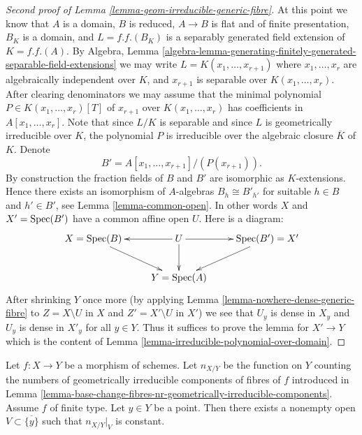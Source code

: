 \begin{proof}[Second proof of Lemma \ref{lemma-geom-irreducible-generic-fibre}]
\medskip\noindent
At this point we know that $A$ is a domain, $B$ is reduced, $A \to B$
is flat and of finite presentation, $B_K$ is a domain, and
$L = f.f.(B_K)$ is a separably generated field extension of $K = f.f.(A)$. By
Algebra, Lemma
\ref{algebra-lemma-generating-finitely-generated-separable-field-extensions}
we may write $L = K(x_1, \ldots, x_{r + 1})$
where $x_1, \ldots, x_r$ are algebraically independent over $K$, and
$x_{r + 1}$ is separable over $K(x_1, \ldots, x_r)$. After clearing
denominators we may assume that the minimal polynomial
$P \in K(x_1, \ldots, x_r)[T]$ of $x_{r + 1}$ over $K(x_1, \ldots, x_r)$
has coefficients in $A[x_1, \ldots, x_r]$. Note that since
$L/K$ is separable and since $L$ is geometrically irreducible over
$K$, the polynomial $P$ is irreducible over the algebraic closure
$\overline{K}$ of $K$. Denote
$$
B' = A[x_1, \ldots, x_{r + 1}]/(P(x_{r + 1})).
$$
By construction the fraction fields of $B$ and $B'$ are isomorphic as
$K$-extensions. Hence there exists an isomorphism of $A$-algebras
$B_h \cong B'_{h'}$ for suitable $h \in B$ and $h' \in B'$, see
Lemma \ref{lemma-common-open}.
In other words $X$ and $X' = \mathop{\rm Spec}(B')$ have a common affine open $U$.
Here is a diagram:
$$
\xymatrix{
X = \Spec(B) \ar[rd] &
U \ar[l] \ar[r] \ar[d] &
\Spec(B') = X' \ar[ld] \\
& Y = \Spec(A) &
}
$$
After shrinking $Y$ once more (by applying
Lemma \ref{lemma-nowhere-dense-generic-fibre}
to $Z = X \setminus U$ in $X$ and $Z' = X' \setminus U$ in $X'$)
we see that $U_y$ is dense in $X_y$ and $U_y$ is dense in $X'_y$
for all $y \in Y$. Thus it suffices to prove the lemma for
$X' \to Y$ which is the content of
Lemma \ref{lemma-irreducible-polynomial-over-domain}.
\end{proof}

\begin{lemma}
\label{lemma-nr-geom-irreducible-components-good}
Let $f : X \to Y$ be a morphism of schemes. Let
$n_{X/Y}$ be the function on $Y$ counting the numbers of geometrically
irreducible components of fibres of $f$ introduced in
Lemma \ref{lemma-base-change-fibres-nr-geometrically-irreducible-components}.
Assume $f$ of finite type.
Let $y \in Y$ be a point. Then there exists a nonempty open
$V \subset \overline{\{y\}}$ such that $n_{X/Y}|_V$ is constant.
\end{lemma}

